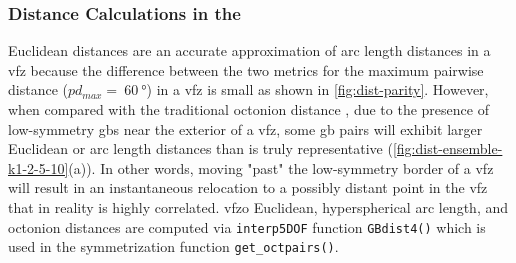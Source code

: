 \documentclass[final,twocolumn,12pt]{elsarticle}
\newcommand{\distfn}{GBdist4}
\begin{document}
\subsubsection{Distance Calculations in the }
\label{sec:methods:vfz-dist}

Euclidean distances are an accurate approximation of arc length distances in a \gls{vfz} because the difference between the two metrics for the maximum pairwise distance ($pd_{max} = ~\SI{60}{\degree}$) in a \gls{vfz} is small as shown in \cref{fig:dist-parity}. However, when compared with the traditional octonion distance \cite{francisGeodesicOctonionMetric2019}, due to the presence of low-symmetry \glspl{gb} near the exterior of a \gls{vfz}, some \gls{gb} pairs will exhibit larger Euclidean or arc length distances than is truly representative (\cref{fig:dist-ensemble-k1-2-5-10}(a)). In other words, moving "past" the low-symmetry border of a \gls{vfz} will result in an instantaneous relocation to a possibly distant point in the \gls{vfz} that in reality is highly correlated. \Gls{vfzo} Euclidean, hyperspherical arc length, and octonion distances are computed via \texttt{interp5DOF} function \texttt{\distfn{}()} which is used in the symmetrization function \texttt{get\_octpairs()}.
\end{document}
